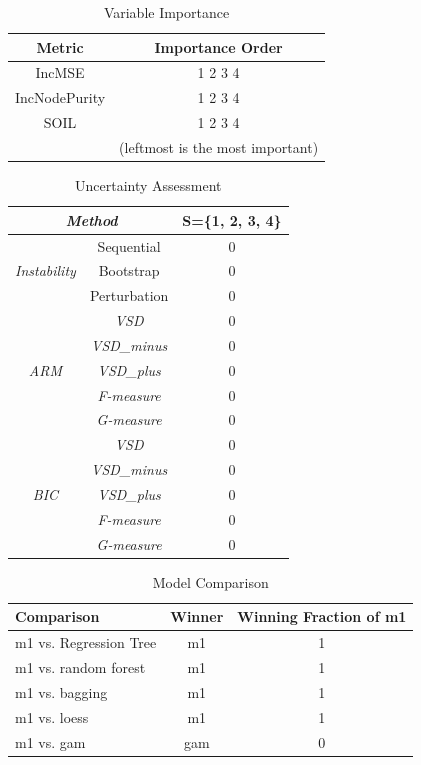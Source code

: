 \documentclass[11pt a4paper]{article}
\begin{document}
\begin{table}[H]
	\centering
	\caption{Variable Importance}
	\begin{tabular}{c|c}
		\hline
		Metric & Importance Order\\
		\hline
		IncMSE & 1 2 3 4  \\
		IncNodePurity & 1 2 3 4  \\
		SOIL & 1 2 3 4  \\
		 & (leftmost is the most important) \\
		\hline
	\end{tabular}
	\label{table:var-importance}
\end{table}

\begin{table}[H]
	\centering
	\caption{Uncertainty Assessment}
	\begin{tabular}{cc|c}
		\hline
		\multicolumn{2}{c|}{\textsl{Method}}& S=\{1, 2, 3, 4\}  \\
		\hline
		\multirow{3}{*}{\textsl{Instability}} & Sequential & 0\\
		& Bootstrap & 0 \\
		& Perturbation & 0 \\
		\hline
		\multirow{5}{*}{\textsl{ARM}} & \textsl{VSD} & 0 \\ 
		& \textsl{VSD\_minus} & 0 \\
		& \textsl{VSD\_plus} & 0 \\
		& \textsl{F-measure} & 0 \\
		& \textsl{G-measure} & 0 \\
		\hline
		\multirow{5}{*}{\textsl{BIC}} & \textsl{VSD} & 0 \\ 
		& \textsl{VSD\_minus} & 0 \\
		& \textsl{VSD\_plus} & 0 \\
		& \textsl{F-measure} & 0 \\
		& \textsl{G-measure} & 0 \\
		\hline
	\end{tabular}
	\label{table:uncertainty}
\end{table}

\begin{table}[H]
	\centering
	\caption{Model Comparison}
	\begin{tabular}{l|cc}
		\hline
		Comparison & Winner & Winning Fraction of m1\\
		\hline
		m1 vs. Regression Tree & m1 & 1 \\
		m1 vs. random forest & m1 & 1 \\
		m1 vs. bagging & m1 & 1 \\
		m1 vs. loess & m1 & 1 \\
		m1 vs. gam & gam & 0 \\
		\hline
	\end{tabular}
	\label{table:compare}
\end{table}
\end{document}
